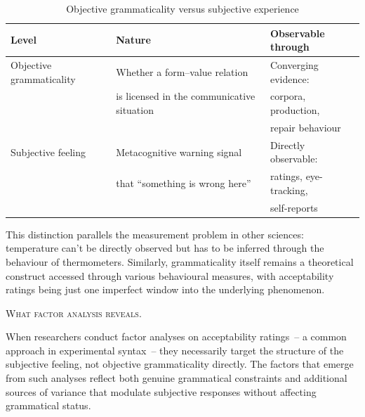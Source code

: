 \documentclass[12pt,letterpaper]{article}
\begin{document}
\begin{table}[h]
\centering
\caption{Objective grammaticality versus subjective experience}
\label{tab:two-levels}
\begin{tabular}{@{}lll@{}}
\toprule
Level & Nature & Observable through\\
\midrule
Objective grammaticality & Whether a form--value relation & Converging evidence:\\
& is licensed in the communicative situation & corpora, production,\\
& & repair behaviour\\[6pt]
Subjective feeling & Metacognitive warning signal & Directly observable:\\
& that \enquote{something is wrong here} & ratings, eye-tracking,\\
& & self-reports\\
\bottomrule
\end{tabular}
\end{table}

This distinction parallels the measurement problem in other sciences: temperature can't be directly observed but has to be inferred through the behaviour of thermometers. Similarly, grammaticality itself remains a theoretical construct accessed through various behavioural measures, with acceptability ratings being just one imperfect window into the underlying phenomenon.

\textsc{What factor analysis reveals.}

When researchers conduct factor analyses on acceptability ratings~-- a common approach in experimental syntax~-- they necessarily target the structure of the subjective feeling, not objective grammaticality directly. The factors that emerge from such analyses reflect both genuine grammatical constraints and additional sources of variance that modulate subjective responses without affecting grammatical status.
\end{document}
